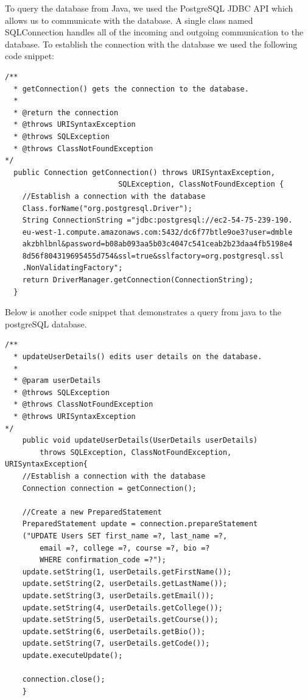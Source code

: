 To query the database from Java, we used the PostgreSQL JDBC API which allows us to communicate with the database. A single class named SQLConnection handles all of the incoming and outgoing communication to the database. To establish the connection with the database we used the following code snippet:

\begin{verbatim}
/**
  * getConnection() gets the connection to the database.
  * 
  * @return the connection
  * @throws URISyntaxException
  * @throws SQLException
  * @throws ClassNotFoundException
*/
  public Connection getConnection() throws URISyntaxException,
                          SQLException, ClassNotFoundException {
    //Establish a connection with the database
    Class.forName("org.postgresql.Driver");
    String ConnectionString ="jdbc:postgresql://ec2-54-75-239-190.
    eu-west-1.compute.amazonaws.com:5432/dc6f77btle9oe3?user=dmble
    akzbhlbnl&password=b08ab093aa5b03c4047c541ceab2b23daa4fb5198e4
    8d56f804319695455d754&ssl=true&sslfactory=org.postgresql.ssl
    .NonValidatingFactory";
    return DriverManager.getConnection(ConnectionString);
  }
\end{verbatim}

Below is another code snippet that demonstrates a query from java to the postgreSQL database.

\begin{verbatim}
/**
  * updateUserDetails() edits user details on the database.
  * 
  * @param userDetails
  * @throws SQLException
  * @throws ClassNotFoundException
  * @throws URISyntaxException
*/
    public void updateUserDetails(UserDetails userDetails) 
        throws SQLException, ClassNotFoundException, URISyntaxException{
    //Establish a connection with the database
    Connection connection = getConnection();

    //Create a new PreparedStatement
    PreparedStatement update = connection.prepareStatement
    ("UPDATE Users SET first_name =?, last_name =?,
        email =?, college =?, course =?, bio =? 
        WHERE confirmation_code =?");
    update.setString(1, userDetails.getFirstName());
    update.setString(2, userDetails.getLastName());
    update.setString(3, userDetails.getEmail());
    update.setString(4, userDetails.getCollege());
    update.setString(5, userDetails.getCourse());
    update.setString(6, userDetails.getBio());
    update.setString(7, userDetails.getCode());
    update.executeUpdate();
    
    connection.close();
    }
	
\end{verbatim}

